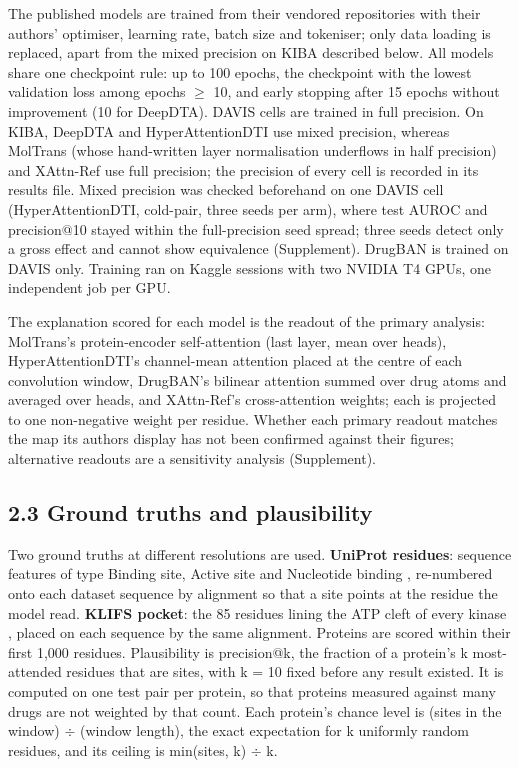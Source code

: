 \documentclass[
  11pt,
]{article}
\begin{document}
The published models are trained from their vendored repositories with their authors' optimiser, learning rate, batch size and tokeniser; only data loading is replaced, apart from the mixed precision on KIBA described below. All models share one checkpoint rule: up to 100 epochs, the checkpoint with the lowest validation loss among epochs $\geq$ 10, and early stopping after 15 epochs without improvement (10 for DeepDTA). DAVIS cells are trained in full precision. On KIBA, DeepDTA and HyperAttentionDTI use mixed precision, whereas MolTrans (whose hand-written layer normalisation underflows in half precision) and XAttn-Ref use full precision; the precision of every cell is recorded in its results file. Mixed precision was checked beforehand on one DAVIS cell (HyperAttentionDTI, cold-pair, three seeds per arm), where test AUROC and precision@10 stayed within the full-precision seed spread; three seeds detect only a gross effect and cannot show equivalence (Supplement). DrugBAN is trained on DAVIS only. Training ran on Kaggle sessions with two NVIDIA T4 GPUs, one independent job per GPU.

The explanation scored for each model is the readout of the primary analysis: MolTrans's protein-encoder self-attention (last layer, mean over heads), HyperAttentionDTI's channel-mean attention placed at the centre of each convolution window, DrugBAN's bilinear attention summed over drug atoms and averaged over heads, and XAttn-Ref's cross-attention weights; each is projected to one non-negative weight per residue. Whether each primary readout matches the map its authors display has not been confirmed against their figures; alternative readouts are a sensitivity analysis (Supplement).

\subsection{2.3 Ground truths and plausibility}\label{ground-truths-and-plausibility}

Two ground truths at different resolutions are used. \textbf{UniProt residues}: sequence features of type Binding site, Active site and Nucleotide binding \citep{UniProt2025}, re-numbered onto each dataset sequence by alignment so that a site points at the residue the model read. \textbf{KLIFS pocket}: the 85 residues lining the ATP cleft of every kinase \citep{vanLinden2014,Kanev2021}, placed on each sequence by the same alignment. Proteins are scored within their first 1,000 residues. Plausibility is precision@k, the fraction of a protein's k most-attended residues that are sites, with k = 10 fixed before any result existed. It is computed on one test pair per protein, so that proteins measured against many drugs are not weighted by that count. Each protein's chance level is (sites in the window) $\div$ (window length), the exact expectation for k uniformly random residues, and its ceiling is min(sites, k) $\div$ k.
\end{document}
